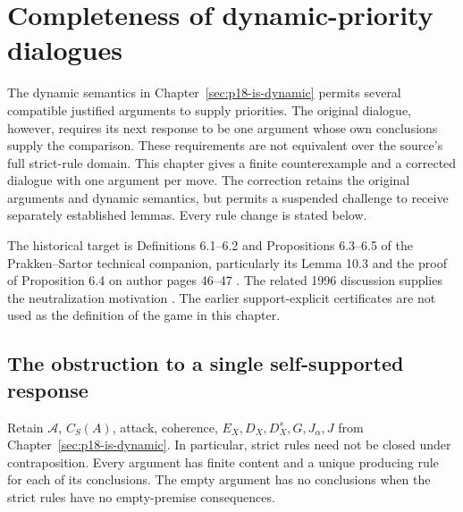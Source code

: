 \chapter{Completeness of dynamic-priority dialogues}
\label{sec:p18-is-dynamic-completeness}

The dynamic semantics in Chapter~\ref{sec:p18-is-dynamic} permits
several compatible justified arguments to supply priorities.
The original dialogue, however, requires its next response to be
one argument whose own conclusions supply the comparison.
These requirements are not equivalent over the source's full
strict-rule domain. This chapter gives a finite counterexample
and a corrected dialogue with one argument per move.
The correction retains the original arguments and dynamic semantics,
but permits a suspended challenge to receive separately established
lemmas. Every rule change is stated below.

The historical target is Definitions 6.1--6.2 and
Propositions 6.3--6.5 of the Prakken--Sartor technical companion,
particularly its Lemma 10.3 and the proof of Proposition 6.4
on author pages 46--47
\cite{PrakkenSartor1997Priorities}.
The related 1996 discussion supplies the neutralization motivation
\cite{PrakkenSartor1996Dialectical}.
The earlier support-explicit certificates are not used as the
definition of the game in this chapter.

\section{The obstruction to a single self-supported response}

Retain \(\mathcal A\), \(C_S(A)\), attack, coherence,
\(E_X,D_X,D_X^s,G,J_\alpha,J\) from
Chapter~\ref{sec:p18-is-dynamic}. In particular, strict rules need
not be closed under contraposition. Every argument has finite
content and a unique producing rule for each of its conclusions.
The empty argument has no conclusions when the strict rules have
no empty-premise consequences.

